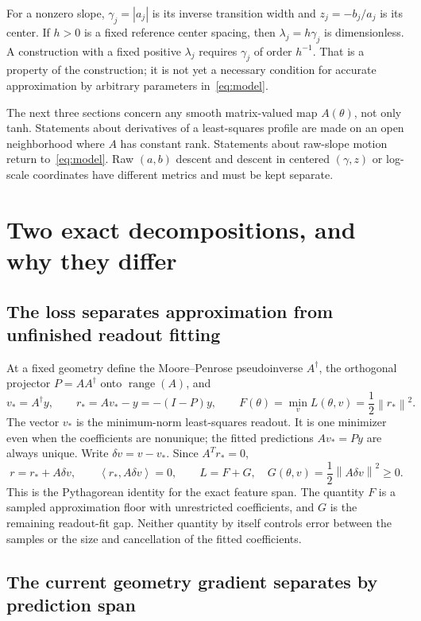 \documentclass[11pt]{article}
\theoremstyle{remark}
\newcommand{\norm}[1]{\left\lVert #1\right\rVert}
\newcommand{\ip}[2]{\left\langle #1,#2\right\rangle}
\newcommand{\range}{\operatorname{range}}
\begin{document}
For a nonzero slope, $\gamma_j=|a_j|$ is its inverse transition width and $z_j=-b_j/a_j$ is its center. If $h>0$ is a fixed reference center spacing, then $\lambda_j=h\gamma_j$ is dimensionless. A construction with a fixed positive $\lambda_j$ requires $\gamma_j$ of order $h^{-1}$. That is a property of the construction; it is not yet a necessary condition for accurate approximation by arbitrary parameters in~\eqref{eq:model}.

The next three sections concern any smooth matrix-valued map $A(\theta)$, not only tanh. Statements about derivatives of a least-squares profile are made on an open neighborhood where $A$ has constant rank. Statements about raw-slope motion return to~\eqref{eq:model}. Raw $(a,b)$ descent and descent in centered $(\gamma,z)$ or log-scale coordinates have different metrics and must be kept separate.

\section{Two exact decompositions, and why they differ}
\subsection{The loss separates approximation from unfinished readout fitting}

At a fixed geometry define the Moore--Penrose pseudoinverse $A^\dagger$, the orthogonal projector $P=AA^\dagger$ onto $\range(A)$, and
\begin{equation}
 v_*=A^\dagger y,\qquad
 r_*=Av_*-y=-(I-P)y,\qquad
 F(\theta)=\min_v L(\theta,v)=\frac12\norm{r_*}^2.
 \label{eq:profile}
\end{equation}
The vector $v_*$ is the minimum-norm least-squares readout. It is one minimizer even when the coefficients are nonunique; the fitted predictions $Av_*=Py$ are always unique. Write $\delta v=v-v_*$. Since $A^Tr_*=0$,
\begin{equation}
 r=r_*+A\delta v,\qquad
 \ip{r_*}{A\delta v}=0,
 \qquad
 \boxed{L=F+G,\quad G(\theta,v)=\frac12\norm{A\delta v}^2\geq0.}
 \label{eq:FG}
\end{equation}
This is the Pythagorean identity for the exact feature span. The quantity $F$ is a sampled approximation floor with unrestricted coefficients, and $G$ is the remaining readout-fit gap. Neither quantity by itself controls error between the samples or the size and cancellation of the fitted coefficients.

\subsection{The current geometry gradient separates by prediction span}
\end{document}
